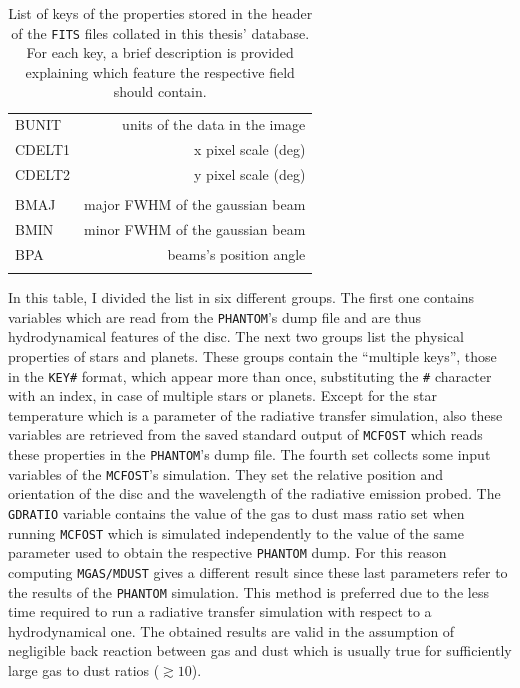 \documentclass[a4paper,10pt]{report}
\begin{document}
\begin{table}
\begin{center}
\begin{tabular}{l r}
        BUNIT & units of the data in the image \\ 
        CDELT1 & x pixel scale (deg) \\
        CDELT2 & y pixel scale (deg)\\ \\
        
        BMAJ & major FWHM of the gaussian beam \\
        BMIN & minor FWHM of the gaussian beam\\
        BPA & beams's position angle \\ \\
        

         \bottomrule
        \end{tabular}
        \end{center}

        \caption{List of keys of the properties stored in the header of the \lstinline{FITS} files
        collated in this thesis' database. For each key, a brief description is provided explaining which 
        feature the respective field should contain.}
\end{table}

In this table, I divided the list in six different groups. The first one contains
variables which are read from the \lstinline{PHANTOM}'s dump file and are thus hydrodynamical features of
the disc. The next two groups list the physical properties of stars and planets. These groups contain the 
``multiple keys'', those in the \lstinline{KEY#} format, which appear more than once, substituting the \lstinline{#} character with an index,
in case of multiple stars or planets.
Except for the star temperature which is a parameter of the radiative transfer simulation, also these variables are retrieved from
the saved standard output of \lstinline{MCFOST} which reads these properties in the \lstinline{PHANTOM}'s dump file.
The fourth set collects some input variables of the \lstinline{MCFOST}'s simulation.
They set the relative position and orientation of the disc and the wavelength of the radiative emission probed.
The \lstinline{GDRATIO} variable contains the value of the gas to dust mass ratio set when running \lstinline{MCFOST}
which is simulated
independently to the value of the same parameter used to obtain the respective \lstinline{PHANTOM} dump. For
this reason computing \lstinline{MGAS/MDUST} gives a different result since these last parameters refer to the results 
of the \lstinline{PHANTOM} simulation.
This method is preferred due to the less time required to run a radiative transfer simulation with respect to a
hydrodynamical one. The obtained results are valid in the assumption of negligible back reaction between gas and dust which
is usually true for sufficiently large gas to dust ratios ($\gtrsim 10$).
\end{document}
